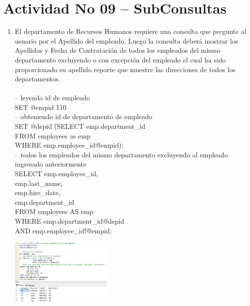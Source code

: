 \section{Actividad No 09 – SubConsultas} 
		
\begin{enumerate}[1.]
	\item El departamento de Recursos Humanos requiere una consulta que pregunte al usuario por el Apellido del empleado, Luego la consulta deber\'a mostrar los Apellidos y Fecha de Contrataci\'on de todos los empleados del mismo departamento excluyendo o con excepción del empleado el cual ha sido proporcionado su apellido reporte que muestre las direcciones de todos los departamentos.
	\\
	\\-- leyendo id de empleado\\
	SET @empid \= 110\\
	-- obteniendo id de departamento de empleado \\
	SET @depid \= (SELECT emp.department\_id \\
	FROM employees as emp \\
	WHERE emp.employee\_id\=@empid); \\
	-- todos los empleados del mismo departamento excluyendo al empleado ingresado anteriormente\\
	SELECT emp.employee\_id, \\
	emp.last\_name, \\
	emp.hire\_date, \\
	emp.department\_id \\
	FROM employees AS emp \\
	WHERE emp.department\_id\=@depid \\
	AND emp.employee\_id!\=@empid; \\
	\begin{center}
	\includegraphics[width=5cm]{./Imagenes/actividad0901} 
	\end{center}


\end{enumerate}
